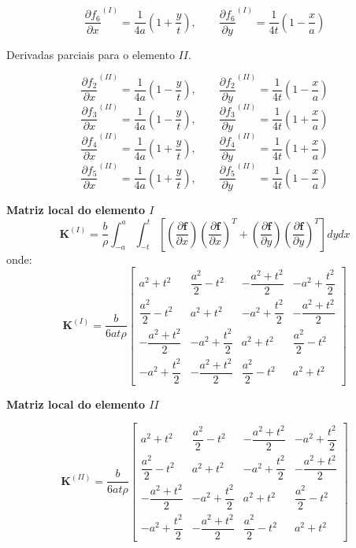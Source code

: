 \documentclass[
12pt,
a4paper,
oneside,
chapter=TITLE,
sumario=tradicional
]{abntex2}
\begin{document}
$$  
\frac{\partial f_6}{\partial x}^{(I)}
=\frac{1}{4a}\left(1+\frac{y}{t}\right),  
\qquad  
\frac{\partial f_6}{\partial y}^{(I)}=
\frac{1}{4t}\left(1-\frac{x}{a}\right)  
$$





Derivadas parciais para o elemento $II$.

$$  
\frac{\partial f_2}{\partial x}^{(II)}
=\frac{1}{4a}\left(1-\frac{y}{t}\right),  
\qquad  
\frac{\partial f_2}{\partial y}^{(II)}
=\frac{1}{4t}\left(1-\frac{x}{a}\right)  
$$
$$  
\frac{\partial f_3}{\partial x}^{(II)}
= \frac{1}{4a}\left(1-\frac{y}{t}\right),  
\qquad  
\frac{\partial f_3}{\partial y}^{(II)}
=\frac{1}{4t}\left(1+\frac{x}{a}\right)  
$$
$$  
\frac{\partial f_4}{\partial x}^{(II)}
= \frac{1}{4a}\left(1+\frac{y}{t}\right),  
\qquad  
\frac{\partial f_4}{\partial y}^{(II)}=
\frac{1}{4t}\left(1+\frac{x}{a}\right)  
$$
$$  
\frac{\partial f_5}{\partial x}^{(II)}
=\frac{1}{4a}\left(1+\frac{y}{t}\right),  
\qquad  
\frac{\partial f_5}{\partial y}^{(II)}=
\frac{1}{4t}\left(1-\frac{x}{a}\right)  
$$



\textbf{Matriz local do elemento $I$}
$$  
\mathbf{K}^{(I)} = 
\frac{b}{\rho}  
\int_{-a}^{a}\int_{-t}^{t}  
\left[  
\left(\frac{\partial \mathbf{f}}{\partial x}\right)  
\left(\frac{\partial \mathbf{f}}{\partial x}\right)^T  
+  
\left(\frac{\partial \mathbf{f}}{\partial y}\right)  
\left(\frac{\partial \mathbf{f}}{\partial y}\right)^T  
\right]dydx  
$$
onde:
$$  
\mathbf{K}^{(I)}
=
\frac{b}{6at\rho}  
\begin{bmatrix}  
	a^2+t^2 & \dfrac{a^2}{2}-t^2 & -\dfrac{a^2+t^2}{2} & -a^2+\dfrac{t^2}{2} \\
	\dfrac{a^2}{2}-t^2 & a^2+t^2 & -a^2+\dfrac{t^2}{2} & -\dfrac{a^2+t^2}{2} \\ 
	-\dfrac{a^2+t^2}{2} & -a^2+\dfrac{t^2}{2} & a^2+t^2 & \dfrac{a^2}{2}-t^2 \\
	-a^2+\dfrac{t^2}{2} & -\dfrac{a^2+t^2}{2} & \dfrac{a^2}{2}-t^2 & a^2+t^2  
\end{bmatrix}  
$$


\textbf{Matriz local do elemento $II$}

$$  
\mathbf{K}^{(II)}
=
\frac{b}{6at\rho}  
\begin{bmatrix}  
	a^2+t^2 & \dfrac{a^2}{2}-t^2 & -\dfrac{a^2+t^2}{2} & -a^2+\dfrac{t^2}{2} \\ 
	\dfrac{a^2}{2}-t^2 & a^2+t^2 & -a^2+\dfrac{t^2}{2} & -\dfrac{a^2+t^2}{2} \\ 
	-\dfrac{a^2+t^2}{2} & -a^2+\dfrac{t^2}{2} & a^2+t^2 & \dfrac{a^2}{2}-t^2 \\ 
	-a^2+\dfrac{t^2}{2} & -\dfrac{a^2+t^2}{2} & \dfrac{a^2}{2}-t^2 & a^2+t^2  
\end{bmatrix}  
$$
\end{document}
